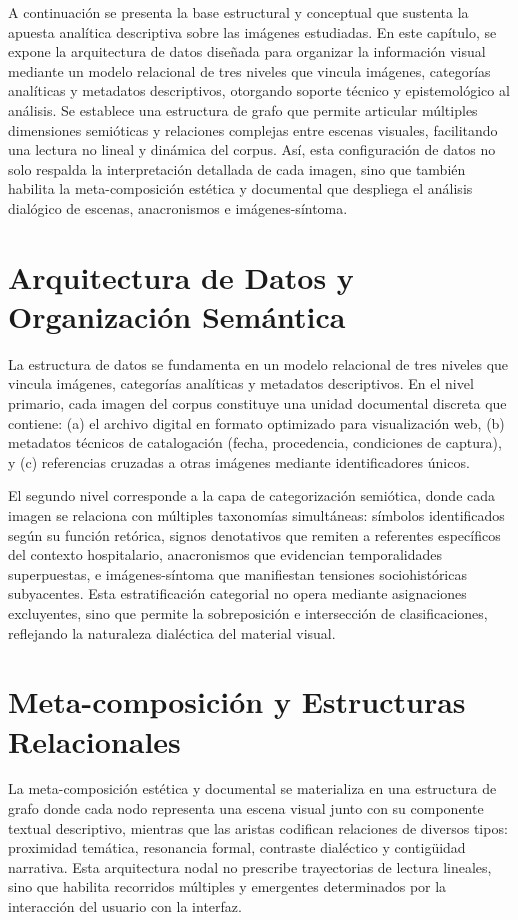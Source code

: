 \textcolor{edit30sept}{A continuación se presenta la base estructural y conceptual que sustenta la apuesta analítica descriptiva sobre las imágenes estudiadas. En este capítulo, se expone la arquitectura de datos diseñada para organizar la información visual mediante un modelo relacional de tres niveles que vincula imágenes, categorías analíticas y metadatos descriptivos, otorgando soporte técnico y epistemológico al análisis. Se establece una estructura de grafo que permite articular múltiples dimensiones semióticas y relaciones complejas entre escenas visuales, facilitando una lectura no lineal y dinámica del corpus. Así, esta configuración de datos no solo respalda la interpretación detallada de cada imagen, sino que también habilita la meta-composición estética y documental que despliega el análisis dialógico de escenas, anacronismos e imágenes-síntoma.}

\section{Arquitectura de Datos y Organización Semántica}
\textcolor{edit30sept}{La estructura de datos se fundamenta en un modelo relacional de tres niveles que vincula imágenes, categorías analíticas y metadatos descriptivos. En el nivel primario, cada imagen del corpus constituye una unidad documental discreta que contiene: (a) el archivo digital en formato optimizado para visualización web, (b) metadatos técnicos de catalogación (fecha, procedencia, condiciones de captura), y (c) referencias cruzadas a otras imágenes mediante identificadores únicos.}

\textcolor{edit30sept}{El segundo nivel corresponde a la capa de categorización semiótica, donde cada imagen se relaciona con múltiples taxonomías simultáneas: símbolos identificados según su función retórica, signos denotativos que remiten a referentes específicos del contexto hospitalario, anacronismos que evidencian temporalidades superpuestas, e imágenes-síntoma que manifiestan tensiones sociohistóricas subyacentes. Esta estratificación categorial no opera mediante asignaciones excluyentes, sino que permite la sobreposición e intersección de clasificaciones, reflejando la naturaleza dialéctica del material visual.}

\section{Meta-composición y Estructuras Relacionales}

\textcolor{edit30sept}{La meta-composición estética y documental se materializa en una estructura de grafo donde cada nodo representa una escena visual junto con su componente textual descriptivo, mientras que las aristas codifican relaciones de diversos tipos: proximidad temática, resonancia formal, contraste dialéctico y contigüidad narrativa. Esta arquitectura nodal no prescribe trayectorias de lectura lineales, sino que habilita recorridos múltiples y emergentes determinados por la interacción del usuario con la interfaz.}


